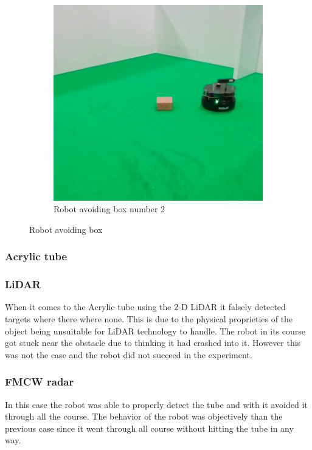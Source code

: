 \begin{figure}[ht!]
\begin{subfigure}[b]{0.38\linewidth}
    \includegraphics[width=\linewidth]{imgs/chapter5/boxRS2.png}
    \caption{Robot avoiding box  number 2}
    \label{fig::nchair}
  \end{subfigure}
  \caption{Robot avoiding box}
  \label{fig:boxRS}
\end{figure}

\subsubsection{Acrylic tube}

\subsubsection*{LiDAR}
When it comes to the Acrylic tube using the 2-D \ac{LiDAR} it falsely detected targets where there where none. This is due to the physical proprieties of the object being unsuitable for \ac{LiDAR} technology to handle. The robot in its course got stuck near the obstacle due to thinking it had crashed into it. However this was not the case and the robot did not succeed in the experiment.
\subsubsection*{FMCW radar}
In this case the robot was able to properly detect the tube and with it avoided it through all the course. The behavior of the robot was objectively than the previous case since it went through all course without hitting the tube in any way.

